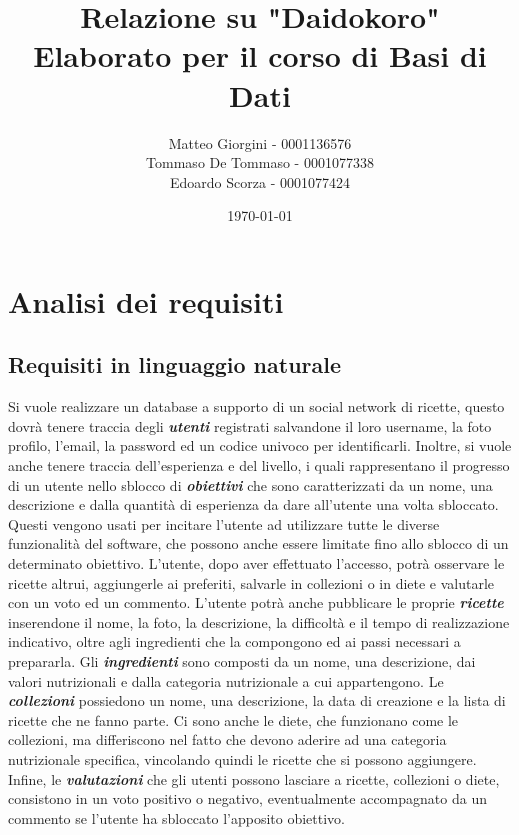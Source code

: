 ﻿\documentclass[a4paper,12pt]{report}
\title{Relazione su "Daidokoro" \\ Elaborato per il corso di Basi di Dati}
\author
{
    Matteo Giorgini - 0001136576 \\
    Tommaso De Tommaso - 0001077338 \\
    Edoardo Scorza - 0001077424 \\
}
\date{\today}
\begin{document}
\maketitle
\tableofcontents


\chapter{Analisi dei requisiti}
\section{Requisiti in linguaggio naturale}
Si vuole realizzare un database a supporto di un social network di ricette, questo dovrà tenere traccia degli \textbf{\textit{utenti}} registrati salvandone il loro username, la foto profilo, l'email, la password ed un codice univoco per identificarli.
Inoltre, si vuole anche tenere traccia dell'esperienza e del livello, i quali rappresentano il progresso di un utente nello sblocco di \textbf{\textit{obiettivi}} che sono caratterizzati da un nome, una descrizione e dalla quantità di esperienza da dare all'utente una volta sbloccato.
Questi vengono usati per incitare l'utente ad utilizzare tutte le diverse funzionalità del software, che possono anche essere limitate fino allo sblocco di un determinato obiettivo.
L'utente, dopo aver effettuato l'accesso, potrà osservare le ricette altrui, aggiungerle ai preferiti, salvarle in collezioni o in diete e valutarle con un voto ed un commento.
L'utente potrà anche pubblicare le proprie \textbf{\textit{ricette}} inserendone il nome, la foto, la descrizione, la difficoltà e il tempo di realizzazione indicativo, oltre agli ingredienti che la compongono ed ai passi necessari a prepararla.
Gli \textbf{\textit{ingredienti}} sono composti da un nome, una descrizione, dai valori nutrizionali e dalla categoria nutrizionale a cui appartengono.
Le \textbf{\textit{collezioni}} possiedono un nome, una descrizione, la data di creazione e la lista di ricette che ne fanno parte.
Ci sono anche le diete, che funzionano come le collezioni, ma differiscono nel fatto che devono aderire ad una categoria nutrizionale specifica, vincolando quindi le ricette che si possono aggiungere.
Infine, le \textbf{\textit{valutazioni}} che gli utenti possono lasciare a ricette, collezioni o diete, consistono in un voto positivo o negativo, eventualmente accompagnato da un commento se l'utente ha sbloccato l'apposito obiettivo.
\\
\end{document}
